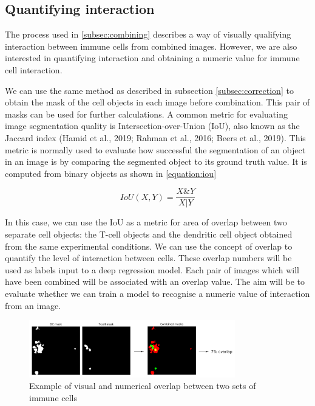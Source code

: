 \subsection{Quantifying interaction}

The process used in \autoref{subsec:combining} describes a way of visually qualifying interaction between immune cells from combined images. However, we are also interested in quantifying interaction and obtaining a numeric value for immune cell interaction.

We can use the same method as described in subsection \ref{subsec:correction} to obtain the mask of the cell objects in each image before combination. This pair of masks can be used for further calculations. A common metric for evaluating image segmentation quality is Intersection-over-Union (IoU), also known as the Jaccard index (Hamid et al., 2019; Rahman et al., 2016; Beers et al., 2019). This metric is normally used to evaluate how successful the segmentation of an object in an image is by comparing the segmented object to its ground truth value. It is computed from binary objects as shown in \autoref{equation:iou}

\begin{equation}
    IoU(X,Y) = \frac{X \& Y}{X | Y}
    \label{equation:iou}
\end{equation}

In this case, we can use the IoU as a metric for area of overlap between two separate cell objects: the T-cell objects and the dendritic cell object obtained from the same experimental conditions. We can use the concept of overlap to quantify the level of interaction between cells. These overlap numbers will be used as labels input to a deep regression model. Each pair of images which will have been combined will be associated with an overlap value. The aim will be to evaluate whether we can train a model to recognise a numeric value of interaction from an image.

\begin{figure}
    \centering
    \includegraphics[width=0.8\textwidth]{dissertation/figures/mask_overlap_operation.png}
    \caption{Example of visual and numerical overlap between two sets of immune cells}
    \label{fig:mask_overlap}
\end{figure}

